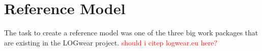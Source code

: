 \section{Reference Model}\label{sec:referenceArchitecture}
The task to create a reference model was one of the three big work packages that are existing in the LOGwear project. \textcolor{red}{should i citep logwear.eu here?} 